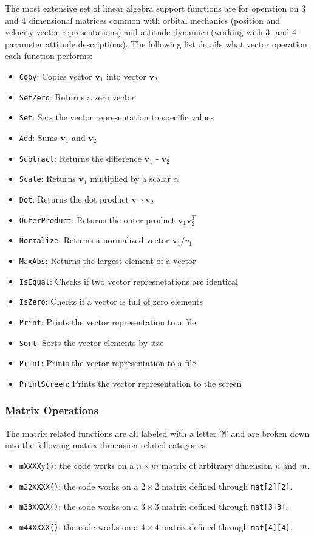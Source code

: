 The most extensive set of linear algebra support functions are for operation on 3 and 4 dimensional matrices common with orbital mechanics (position and velocity vector representations) and attitude dynamics (working with 3- and 4-parameter attitude descriptions).  The following list details what vector operation each function performs:
\begin{itemize}
	\item {\tt Copy}: Copies vector $\bm v_{1}$ into vector $\bm v_{2}$
	\item {\tt SetZero}: Returns a zero vector
	\item {\tt Set}: Sets the vector representation to specific values
	\item {\tt Add}: Sums  $\bm v_{1}$ and  $\bm v_{2}$
	\item {\tt Subtract}: Returns the difference  $\bm v_{1}$ - $\bm v_{2}$
	\item {\tt Scale}: Returns $\bm v_{1}$ multiplied by a scalar $\alpha$
	\item {\tt Dot}: Returns the dot product $\bm v_{1} \cdot \bm v_{2}$
	\item {\tt OuterProduct}: Returns the outer product $\bm v_{1} \bm v_{2}^{T}$
	\item {\tt Normalize}: Returns a normalized vector $\bm v_{1}/ v_{1}$
	\item {\tt MaxAbs}: Returns the largest element of a vector
	\item {\tt IsEqual}: Checks if two vector represnetations are identical	
	\item {\tt IsZero}: Checks if a vector is full of zero elements
	\item {\tt Print}: Prints the vector representation to a file
	\item {\tt Sort}: Sorts the vector elements by size
	\item {\tt Print}: Prints the vector representation to a file
	\item {\tt PrintScreen}: Prints the vector representation to the screen
\end{itemize}





\subsubsection{Matrix Operations}
The matrix related functions are all labeled with a letter '{\tt M}' and are broken down into the following matrix dimension related categories:
\begin{itemize}
	\item  {\tt mXXXXy()}: the code works on a $n\times m$ matrix of arbitrary dimension $n$ and $m$.
	\item {\tt m22XXXX()}: the code works on a $2\times 2$ matrix defined through {\tt mat[2][2]}. 
	\item {\tt m33XXXX()}: the code works on a $3\times 3$ matrix defined through {\tt mat[3]3]}. 
	\item {\tt m44XXXX()}: the code works on a $4\times 4$ matrix defined through {\tt mat[4][4]}. 
\end{itemize}

